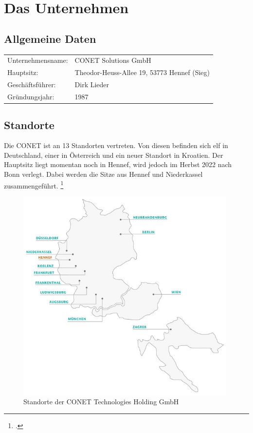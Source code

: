 \section{Das Unternehmen}
\subsection{Allgemeine Daten}

\begin{tabular}{ l l }
Unternehmensname: & CONET Solutions GmbH \\
Hauptsitz: & Theodor-Heuss-Allee 19, 53773 Hennef (Sieg) \\
Geschäftsführer: & Dirk Lieder \\
Gründungsjahr: & 1987 
\end{tabular}


\subsection{Standorte}
Die CONET ist an 13 Standorten vertreten. Von diesen befinden sich elf in Deutschland, einer in Österreich und ein neuer Standort in Kroatien. Der Hauptsitz liegt momentan noch in Hennef, wird jedoch im Herbst 2022 nach Bonn verlegt. Dabei werden die Sitze aus Hennef und Niederkassel zusammengeführt. \footcite [Internes Dokument]{QuickGuide} 
\begin{figure}[H]
  \centering
    \includegraphics[width = 11cm]{bilder/standorte}
    \caption{Standorte der CONET Technologies Holding GmbH}
\end{figure}

